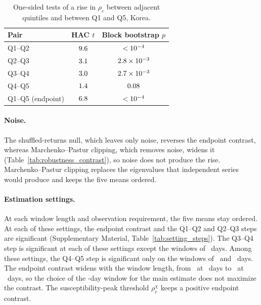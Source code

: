 \documentclass[a4paper,fleqn]{cas-sc}
\begin{document}
\begin{table}[pos=htbp]
\centering
\begin{threeparttable}
\caption{One-sided tests of a rise in $\rho_c$ between adjacent quintiles and between Q1 and Q5, Korea.}\label{tab:pair_significance}
\begin{tabular}{lcc}
\toprule
Pair & HAC $t$ & Block bootstrap $p$ \\
\midrule
Q1--Q2 & $9.6$   & $<10^{-4}$ \\
Q2--Q3 & $3.1$ & $2.8 \times 10^{-3}$ \\
Q3--Q4 & $3.0$ & $2.7 \times 10^{-3}$ \\
Q4--Q5 & $1.4$ & $0.08$ \\
\midrule
Q1--Q5 (endpoint) & $6.8$ & $<10^{-4}$ \\
\bottomrule
\end{tabular}
\end{threeparttable}
\end{table}

\paragraph{Noise.} The shuffled-returns null, which leaves only noise, reverses the endpoint contrast, whereas Marchenko--Pastur clipping, which removes noise, widens it (Table~\ref{tab:robustness_contrast}), so noise does not produce the rise. Marchenko--Pastur clipping replaces the eigenvalues that independent series would produce and keeps the five means ordered.

\paragraph{Estimation settings.} At each window length and observation requirement, the five means stay ordered. At each of these settings, the endpoint contrast and the Q1--Q2 and Q2--Q3 steps are significant (Supplementary Material, Table~\ref{tab:setting_steps}). The Q3--Q4 step is significant at each of these settings except the windows of \windowDaysWthirty\ days. Among these settings, the Q4--Q5 step is significant only on the windows of \windowDaysWhundredtwenty\ and \windowDaysWtwofifty\ days. The endpoint contrast widens with the window length, from \rhoCGapWthirty\ at \windowDaysWthirty\ days to \rhoCGapWtwofifty\ at \windowDaysWtwofifty\ days, so the choice of the \paperWindowDays-day window for the main estimate does not maximize the contrast. The susceptibility-peak threshold $\rho_c^{\chi}$ keeps a positive endpoint contrast.
\end{document}
